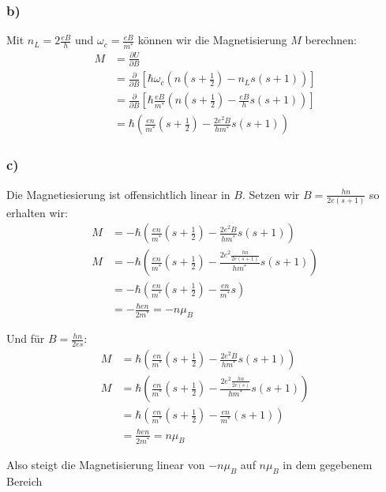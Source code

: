 \subsubsection*{b)}
Mit $n_L = 2\frac{eB}{h}$ und $\omega_c = \frac{eB}{m^*}$ können wir die Magnetisierung $M$ berechnen:
\begin{align*}
M &= \frac{\partial U}{\partial B}\\
 &= \frac{\partial}{\partial B} \left[\hbar\omega_c\left(n\left(s+\frac 12\right)-n_L s(s+1)\right)\right] \\
 &= \frac{\partial}{\partial B} \left[\hbar\frac{eB}{m^*}\left(n\left(s+\frac 12\right)-\frac{eB}{h} s(s+1)\right)\right]\\
 &= \hbar\left(\frac{en}{m^*}\left(s+\frac 12\right)-\frac{2e^2B}{hm^*} s(s+1)\right)
\end{align*}

\subsubsection*{c)}
Die Magnetiesierung ist offensichtlich linear in $B$. Setzen wir $B = \frac{hn}{2e(s+1)}$ so erhalten wir:
\begin{align*}
M &= -\hbar\left(\frac{en}{m^*}\left(s+\frac 12\right)-\frac{2e^2B}{hm^*} s(s+1)\right)\\
M &= -\hbar\left(\frac{en}{m^*}\left(s+\frac 12\right)-\frac{2e^2\frac{hn}{2e(s+1)}}{hm^*} s(s+1)\right) \\
&= -\hbar\left(\frac{en}{m^*}\left(s+\frac 12\right) - \frac{en}{m^*}s\right)\\
&= -\frac{\hbar en}{2m^*} = -n \mu_B
\end{align*}

Und für $B = \frac{hn}{2es}$:
\begin{align*}
M &= \hbar\left(\frac{en}{m^*}\left(s+\frac 12\right)-\frac{2e^2B}{hm^*} s(s+1)\right)\\
M &= \hbar\left(\frac{en}{m^*}\left(s+\frac 12\right)-\frac{2e^2\frac{hn}{2e(s)}}{hm^*} s(s+1)\right) \\
&= \hbar\left(\frac{en}{m^*}\left(s+\frac 12\right) - \frac{en}{m^*}(s+1)\right)\\
&= \frac{\hbar en}{2m^*} = n \mu_B
\end{align*}

Also steigt die Magnetisierung linear von $-n \mu_B$ auf $n \mu_B$ in dem gegebenem Bereich